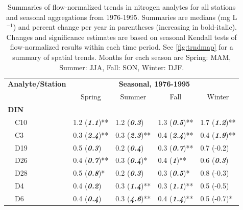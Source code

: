 \documentclass[journal = esthag, manuscript = article]{achemso}\usepackage[]{graphicx}\usepackage[]{color}
\begin{document}
\begin{table}[!tbp]
\caption{Summaries of flow-normalized trends in nitrogen analytes for all stations and seasonal aggregations from 1976-1995. Summaries are  medians (mg L$^{-1}$) and percent change per year in parentheses (increasing in bold-italic). Changes and significance estimates are based on seasonal Kendall tests of flow-normalized results within each time period. See \cref{fig:trndmap} for a summary of spatial trends. Months for each season are Spring: MAM, Summer: JJA, Fall: SON, Winter: DJF.\label{tab:trndsbef}} 
\begin{center}
\begin{tabular}{lllll}
\hline\hline
\multicolumn{1}{l}{\bfseries Analyte/Station}&\multicolumn{4}{c}{\bfseries Seasonal, 1976-1995}\tabularnewline
\cline{2-5}
\multicolumn{1}{l}{}&\multicolumn{1}{c}{Spring}&\multicolumn{1}{c}{Summer}&\multicolumn{1}{c}{Fall}&\multicolumn{1}{c}{Winter}\tabularnewline
\hline
{\bfseries DIN}&&&&\tabularnewline
~~C10&1.2 \footnotesize{(\textit{\textbf{1.1}})**}&1.2 \footnotesize{(\textit{\textbf{0.3}})}&1.3 \footnotesize{(\textit{\textbf{0.5}})**}&1.7 \footnotesize{(\textit{\textbf{1.2}})**}\tabularnewline
~~C3&0.3 \footnotesize{(\textit{\textbf{2.4}})**}&0.3 \footnotesize{(\textit{\textbf{2.3}})**}&0.4 \footnotesize{(\textit{\textbf{2.4}})**}&0.4 \footnotesize{(\textit{\textbf{1.9}})**}\tabularnewline
~~D19&0.5 \footnotesize{(\textit{\textbf{0.3}})}&0.2 \footnotesize{(\textit{\textbf{0.4}})}&0.3 \footnotesize{(\textit{\textbf{0.7}})**}&0.7 \footnotesize{(-0.2)}\tabularnewline
~~D26&0.4 \footnotesize{(\textit{\textbf{0.7}})**}&0.3 \footnotesize{(\textit{\textbf{0.4}})*}&0.4 \footnotesize{(\textit{\textbf{1}})**}&0.6 \footnotesize{(\textit{\textbf{0.3}})}\tabularnewline
~~D28&0.5 \footnotesize{(\textit{\textbf{0.8}})*}&0.2 \footnotesize{(\textit{\textbf{0.3}})}&0.3 \footnotesize{(\textit{\textbf{0.5}})*}&0.8 \footnotesize{(-0.3)}\tabularnewline
~~D4&0.4 \footnotesize{(\textit{\textbf{0.2}})}&0.3 \footnotesize{(\textit{\textbf{1.4}})**}&0.3 \footnotesize{(\textit{\textbf{1.1}})**}&0.5 \footnotesize{(-0.5)}\tabularnewline
~~D6&0.4 \footnotesize{(\textit{\textbf{0.4}})}&0.3 \footnotesize{(\textit{\textbf{4.6}})**}&0.4 \footnotesize{(\textit{\textbf{1.4}})**}&0.5 \footnotesize{(-0.7)*}\tabularnewline

\end{tabular}
\end{center}
\end{table}
\end{document}

